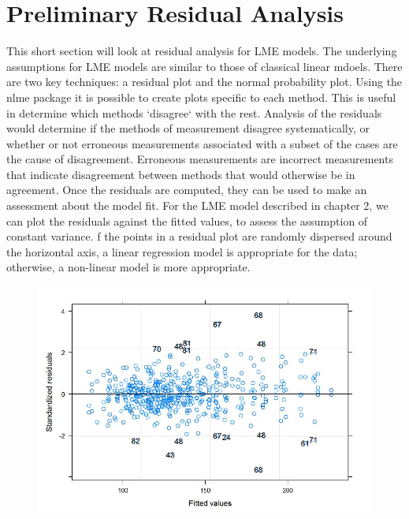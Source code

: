 \documentclass[12pt, a4paper]{report}
\theoremstyle{plain}
\theoremstyle{definition}
\theoremstyle{remark}
\begin{document}
	
	
	\section*{Preliminary Residual Analysis }
	
	This short section will look at residual analysis for LME models. The underlying assumptions for LME models are similar to those of classical linear mdoels. There are two key techniques: a residual plot and the normal probability plot. Using the nlme package it is possible to create plots specific to each method. This is useful in determine which methods `disagree` with the rest.
	Analysis of the residuals would determine if the methods of measurement disagree systematically, or whether or not erroneous measurements associated with a subset of the cases are the cause of disagreement.
	Erroneous measurements are incorrect measurements that indicate disagreement between methods that would otherwise be in agreement.
	Once the residuals are computed, they can be used to make an assessment about the model fit. For the LME model described in chapter 2, we can plot the residuals against the fitted values, to assess the assumption of constant variance. f the points in a residual plot are randomly dispersed around the horizontal axis, a linear regression model is appropriate for the data; otherwise, a non-linear model is more appropriate.
		
		\begin{figure}[h!]
			\centering
			\includegraphics[width=0.9\linewidth]{images/Residuals-JS-Roy}
			\caption{}
			\label{fig:Residuals-JS-Roy}
		\end{figure}
		
\end{document}
